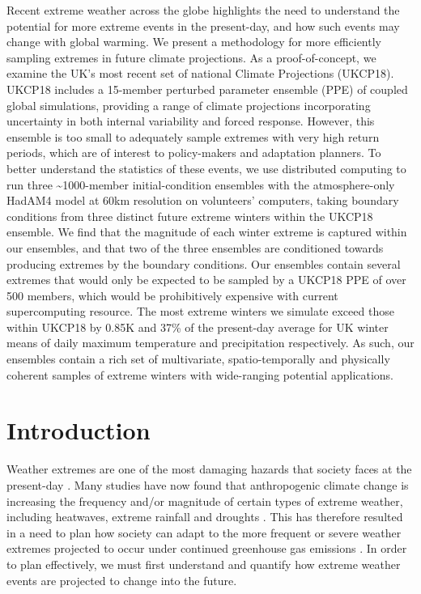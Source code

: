   Recent extreme weather across the globe highlights the need to understand the potential for more extreme events in the present-day, and how such events may change with global warming. We present a methodology for more efficiently sampling extremes in future climate projections. As a proof-of-concept, we examine the UK's most recent set of national Climate Projections (UKCP18). UKCP18 includes a 15-member perturbed parameter ensemble (PPE) of coupled global simulations, providing a range of climate projections incorporating uncertainty in both internal variability and forced response. However, this ensemble is too small to adequately sample extremes with very high return periods, which are of interest to policy-makers and adaptation planners. To better understand the statistics of these events, we use distributed computing to run three \textasciitilde1000-member initial-condition ensembles with the atmosphere-only HadAM4 model at 60km resolution on volunteers' computers, taking boundary conditions from three distinct future extreme winters within the UKCP18 ensemble. We find that the magnitude of each winter extreme is captured within our ensembles, and that two of the three ensembles are conditioned towards producing extremes by the boundary conditions. Our ensembles contain several extremes that would only be expected to be sampled by a UKCP18 PPE of over 500 members, which would be prohibitively expensive with current supercomputing resource. The most extreme winters we simulate exceed those within UKCP18 by 0.85K and 37\% of the present-day average for UK winter means of daily maximum temperature and precipitation respectively. As such, our ensembles contain a rich set of multivariate, spatio-temporally and physically coherent samples of extreme winters with wide-ranging potential applications.

\section{Introduction}

  Weather extremes are one of the most damaging hazards that society faces at the present-day \citep{wef_global_2021}. Many studies have now found that anthropogenic climate change is increasing the frequency and/or magnitude of certain types of extreme weather, including heatwaves, extreme rainfall and droughts \citep{masson-delmotte_weather_2021}. This has therefore resulted in a need to plan how society can adapt to the more frequent or severe weather extremes projected to occur under continued greenhouse gas emissions \citep{allen_warming_2009,diffenbaugh_quantifying_2017,rahmstorf_increase_2011}. In order to plan effectively, we must first understand and quantify how extreme weather events are projected to change into the future.

